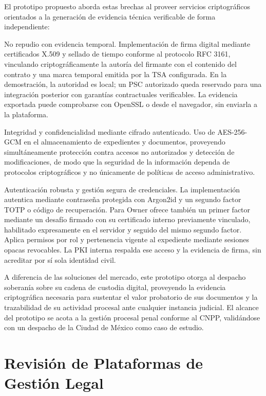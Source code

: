 El prototipo propuesto aborda estas brechas al proveer servicios criptográficos orientados a la generación de evidencia técnica verificable de forma independiente:

No repudio con evidencia temporal. Implementación de firma digital mediante certificados X.509 y sellado de tiempo conforme al protocolo RFC 3161, vinculando criptográficamente la autoría del firmante con el contenido del contrato y una marca temporal emitida por la TSA configurada. En la demostración, la autoridad es local; un PSC autorizado queda reservado para una integración posterior con garantías contractuales verificables. La evidencia exportada puede comprobarse con OpenSSL o desde el navegador, sin enviarla a la plataforma.

Integridad y confidencialidad mediante cifrado autenticado. Uso de AES-256-GCM en el almacenamiento de expedientes y documentos, proveyendo simultáneamente protección contra accesos no autorizados y detección de modificaciones, de modo que la seguridad de la información dependa de protocolos criptográficos y no únicamente de políticas de acceso administrativo.

Autenticación robusta y gestión segura de credenciales. La implementación autentica mediante contraseña protegida con Argon2id y un segundo factor TOTP o código de recuperación. Para Owner ofrece también un primer factor mediante un desafío firmado con su certificado interno previamente vinculado, habilitado expresamente en el servidor y seguido del mismo segundo factor. Aplica permisos por rol y pertenencia vigente al expediente mediante sesiones opacas revocables. La PKI interna respalda ese acceso y la evidencia de firma, sin acreditar por sí sola identidad civil.

A diferencia de las soluciones del mercado, este prototipo otorga al despacho soberanía sobre su cadena de custodia digital, proveyendo la evidencia criptográfica necesaria para sustentar el valor probatorio de sus documentos y la trazabilidad de su actividad procesal ante cualquier instancia judicial. El alcance del prototipo se acota a la gestión procesal penal conforme al CNPP, validándose con un despacho de la Ciudad de México como caso de estudio.

\section{Revisión de Plataformas de Gestión Legal}\label{sec:revision-plataformas}

